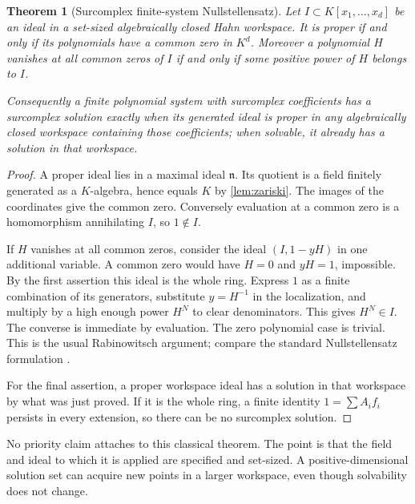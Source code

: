 \documentclass[11pt,letterpaper]{article}
\numberwithin{equation}{section}
\newtheorem{theorem}{Theorem}[section]
\theoremstyle{definition}
\theoremstyle{remark}\newtheorem{remark}[theorem]{Remark}
\begin{document}
\begin{theorem}[Surcomplex finite-system Nullstellensatz]
\label{thm:nullstellensatz}
Let $I\subset K[x_1,\ldots,x_d]$ be an ideal in a set-sized
algebraically closed Hahn workspace. It is proper if and only if
its polynomials have a common zero in $K^d$. Moreover a polynomial
$H$ vanishes at all common zeros of $I$ if and only if some positive
power of $H$ belongs to $I$.

Consequently a finite polynomial system with surcomplex coefficients
has a surcomplex solution exactly when its generated ideal is proper
in any algebraically closed workspace containing those coefficients;
when solvable, it already has a solution in that workspace.
\end{theorem}
\begin{proof}
A proper ideal lies in a maximal ideal $\mathfrak n$. Its quotient
is a field finitely generated as a $K$-algebra, hence equals $K$ by
\cref{lem:zariski}. The images of the coordinates give the common
zero. Conversely evaluation at a common zero is a homomorphism
annihilating $I$, so $1\notin I$.

If $H$ vanishes at all common zeros, consider the ideal
$(I,1-yH)$ in one additional variable. A common zero would have
$H=0$ and $yH=1$, impossible. By the first assertion this ideal is
the whole ring. Express $1$ as a finite combination of its generators,
substitute $y=H^{-1}$ in the localization, and multiply by a high
enough power $H^N$ to clear denominators. This gives $H^N\in I$.
The converse is immediate by evaluation. The zero polynomial case is
trivial. This is the usual Rabinowitsch argument; compare the standard
Nullstellensatz formulation \cite{Stacks}.

For the final assertion, a proper workspace ideal has a solution in
that workspace by what was just proved. If it is the whole ring,
a finite identity $1=\sum A_if_i$ persists in every extension, so
there can be no surcomplex solution.
\end{proof}
No priority claim attaches to this classical theorem. The point is
that the field and ideal to which it is applied are specified and
set-sized. A positive-dimensional solution set can acquire new points
in a larger workspace, even though solvability does not change.
\end{document}

